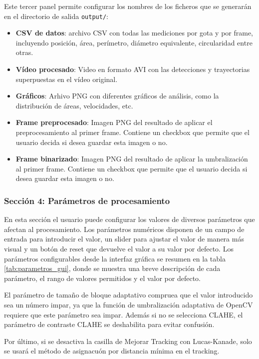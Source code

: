 Este tercer panel permite configurar los nombres de los ficheros que se generarán en el directorio de salida \texttt{output/}:
\begin{itemize}
    \item \textbf{CSV de datos}: archivo CSV con todas las mediciones por gota y por frame, incluyendo posición, área, perímetro, diámetro equivalente, circularidad entre otras.
    \item \textbf{Vídeo procesado}: Video en formato AVI con las detecciones y trayectorias superpuestas en el vídeo original.
    \item \textbf{Gráficos}: Arhivo PNG con diferentes gráficos de análisis, como la distribución de áreas, velocidades, etc.
    \item \textbf{Frame preprocesado}: Imagen PNG del resultado de aplicar el preprocesamiento al primer frame. Contiene un checkbox que permite que el usuario decida si desea guardar esta imagen o no.
    \item \textbf{Frame binarizado}: Imagen PNG del resultado de aplicar la umbralización al primer frame. Contiene un checkbox que permite que el usuario decida si desea guardar esta imagen o no. 
\end{itemize}

\subsubsection{Sección 4: Parámetros de procesamiento}

En esta sección el usuario puede configurar los valores de diversos parámetros que afectan al procesamiento. Los parámetros numéricos disponen de un campo de entrada para introducir el valor, un slider para ajustar el valor de manera más visual y un botón de reset que devuelve el valor a su valor por defecto. Los parámetros configurables desde la interfaz gráfica se resumen en la tabla \ref{tab:parametros_gui}, donde se muestra una breve descripción de cada parámetro, el rango de valores permitidos y el valor por defecto.

El parámetro de tamaño de bloque adaptativo compruea que el valor introducido sea un número impar, ya que la función de umbralización adaptativa de OpenCV requiere que este parámetro sea impar. Además si no se selecciona CLAHE, el parámetro de contraste CLAHE se deshabilita para evitar confusión.

Por último, si se desactiva la casilla de Mejorar Tracking con Lucas-Kanade, solo se usará el método de asignacuón por distancia mínima en el tracking.

